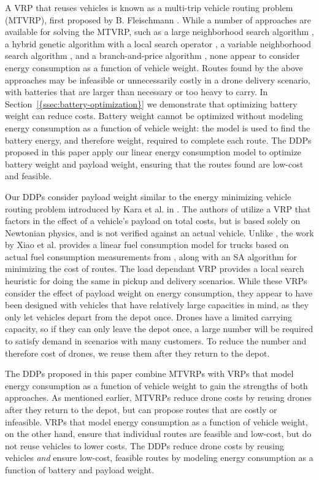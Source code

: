 \documentclass[journal]{IEEEtran}
\begin{document}
A VRP that reuses vehicles is known as a multi-trip vehicle routing problem (MTVRP), first proposed by B. Fleischmann \cite{Fleischmann1990}. While a number of approaches are available for solving the MTVRP, such as a large neighborhood search algorithm \cite{Azi2014}, a hybrid genetic algorithm with a local search operator \cite{Cattaruzza2014}, a variable neighborhood search algorithm \cite{Cheikh2015}, and a branch-and-price algorithm \cite{Hernandez2016}, none appear to consider energy consumption as a function of vehicle weight. Routes found by the above approaches may be infeasible or unnecessarily costly in a drone delivery scenario, with batteries that are larger than necessary or too heavy to carry. In {Section~\ref{{ssec:battery-optimization}}} we demonstrate that optimizing battery weight can reduce costs. Battery weight cannot be optimized without modeling energy consumption as a function of vehicle weight: the model is used to find the battery energy, and therefore weight, required to complete each route. The DDPs proposed in this paper apply our linear energy consumption model to optimize battery weight and payload weight, ensuring that the routes found are low-cost and feasible.

Our DDPs consider payload weight similar to the energy minimizing vehicle routing problem introduced by Kara et al. in \cite{Kara2007}. The authors of \cite{Kara2007} utilize a VRP that factors in the effect of a vehicle's payload on total costs, but is based solely on Newtonian physics, and is not verified against an actual vehicle. Unlike \cite{Kara2007}, the work by Xiao et al. \cite{Xiao2012} provides a linear fuel consumption model for trucks based on actual fuel consumption measurements from \cite{JapanFuelConsumption}, along with an SA algorithm for minimizing the cost of routes. The load dependant VRP \cite{Zachariadis2015} provides a local search heuristic for doing the same in pickup and delivery scenarios. While these VRPs consider the effect of payload weight on energy consumption, they appear to have been designed with vehicles that have relatively large capacities in mind, as they only let vehicles depart from the depot once. Drones have a limited carrying capacity, so if they can only leave the depot once, a large number will be required to satisfy demand in scenarios with many customers. To reduce the number and therefore cost of drones, we reuse them after they return to the depot.

The DDPs proposed in this paper combine MTVRPs with VRPs that model energy consumption as a function of vehicle weight to gain the strengths of both approaches. As mentioned earlier, MTVRPs reduce drone costs by reusing drones after they return to the depot, but can propose routes that are costly or infeasible. VRPs that model energy consumption as a function of vehicle weight, on the other hand, ensure that individual routes are feasible and low-cost, but do not reuse vehicles to lower costs. The DDPs reduce drone costs by reusing vehicles \emph{and} ensure low-cost, feasible routes by modeling energy consumption as a function of battery and payload weight.
\end{document}
